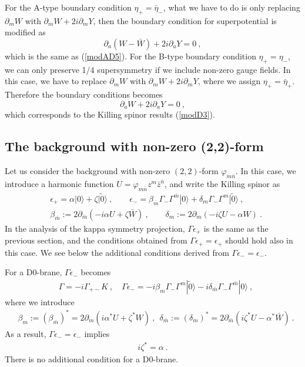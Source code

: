 \documentclass[a4paper,12pt]{article}
\numberwithin{equation}{section}
\newcommand{\del}{\partial}
\newcommand{\mb}{\bar{m}}
\newcommand{\nb}{\bar{n}}
\newcommand{\zb}{\bar{z}}
\newcommand{\vp}{\varphi}
\newcommand{\vac}{|0\rangle}
\newcommand{\vact}{|\tilde 0\rangle}
\newcommand{\nn}{\nonumber\\}
\begin{document}
For the A-type boundary condition $\eta_+ = \bar{\eta}_-$,
what we have to do is only replacing 
$\partial_m W$ with $\partial_m W + 2 i \partial_m Y$, then the boundary
condition for superpotential is modified as \cite{Lindstrom:2002jb}
\begin{equation}
 \partial_a (W -\bar{W}) + 2 i \partial_a Y = 0 ~,
\end{equation} 
which is the same as (\ref{modAD5}).
For the B-type boundary condition $\eta_+ = \eta_-$, 
we can only preserve 1/4 supersymmetry if we include non-zero gauge fields.
In this case, we have to replace 
$\partial_m W$ with $\partial_m W + 2 i \partial_m Y$,
where we assign $\eta_+ = \bar{\eta}_+ $.
Therefore the boundary conditions becomes
\begin{equation}
 \partial_a W + 2 i \partial_a Y = 0 ~, 
\end{equation}
which corresponds to the Killing spinor results (\ref{modD3}).


\subsection{The background with non-zero (2,2)-form}
\label{subsec-non-zero-V}

Let us consider the background with non-zero $(2,2)$-form $\vp_{m\nb}$.
In this case, we introduce a harmonic function 
$U=\vp_{m\nb}z^{m}\zb^{\nb}$, and write the Killing spinor as
\begin{align}
 &\epsilon_{+}=\alpha \vac+\zeta \vact~,\qquad
 \epsilon_{-}=\beta_{\mb}\Gamma_{-}\Gamma^{\mb}\vac
                        +\delta_{m}\Gamma_{-}\Gamma^{m}\vact~,\nn
 &\beta_{\mb}:=2\del_{\mb}(- i \alpha U + \zeta \bar W)~,\qquad
 \delta_{m}:=2\del_{m}(- i \zeta U - \alpha W) ~.
\end{align}
In the analysis of the kappa symmetry projection,
 $ \Gamma \epsilon_{+}$ is the same as the previous section, and 
the conditions obtained from $\Gamma \epsilon_{+}=\epsilon_{+}$
should hold also in this case. We see below the additional conditions
derived from $\Gamma \epsilon_{-}=\epsilon_{-}$.

For a D0-brane, $\Gamma\epsilon_{-}$ becomes
\begin{align}
 &\Gamma=-i\Gamma_{+-}K~,\quad
 \Gamma\epsilon_{-}=-i\beta_{m}\Gamma_{-}\Gamma^{m}\vact
                   -i\delta_{\mb}\Gamma_{-}\Gamma^{\mb}\vac~,
\end{align}
where we introduce
\begin{align}
 &\beta_{m}:=(\beta_{\mb})^*=2\del_{m}(i\alpha^* U + \zeta^*  W)~,~~
 \delta_{\mb}:=(\delta_{m})^*=2\del_{\mb}(i\zeta^* U - \alpha^* \bar W)~.
\end{align}
As a result, $\Gamma \epsilon_{-}=\epsilon_{-}$ implies
\begin{align}
 i \zeta^* =\alpha ~.
\end{align}
There is no additional condition for a D0-brane.
\end{document}
